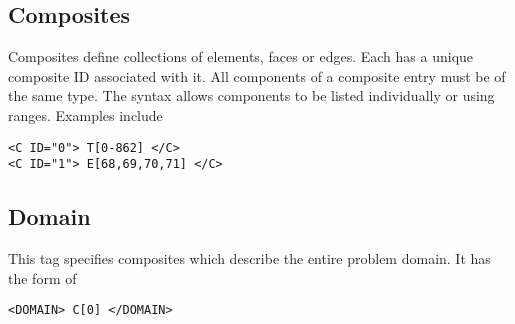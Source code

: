 \subsection{Composites}
Composites define collections of elements, faces or edges. Each has a unique composite ID associated with it. All components of a composite entry must be of the same type. The syntax allows components to be listed individually or using ranges. Examples include
\begin{lstlisting}[style=XMLStyle]
<C ID="0"> T[0-862] </C>
<C ID="1"> E[68,69,70,71] </C>
\end{lstlisting}


\subsection{Domain}
This tag specifies composites which describe the entire problem domain. It has the form of
\begin{lstlisting}[style=XMLStyle]
<DOMAIN> C[0] </DOMAIN>
\end{lstlisting}
